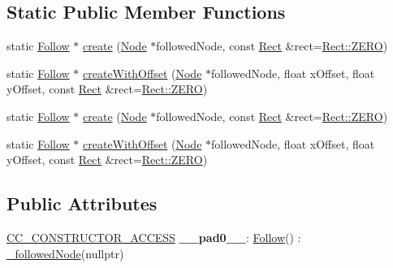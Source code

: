 \subsection*{Static Public Member Functions}
\begin{DoxyCompactItemize}
\item 
static \hyperlink{classFollow}{Follow} $\ast$ \hyperlink{classFollow_aeb7d82d7545e2b2ab7826f8f6661d5b7}{create} (\hyperlink{classNode}{Node} $\ast$followed\+Node, const \hyperlink{classRect}{Rect} \&rect=\hyperlink{classRect_a590be46e60027b2ca0f62a457f91a83e}{Rect\+::\+Z\+E\+RO})
\item 
static \hyperlink{classFollow}{Follow} $\ast$ \hyperlink{classFollow_aaf83879939906af8b827af3dd845383b}{create\+With\+Offset} (\hyperlink{classNode}{Node} $\ast$followed\+Node, float x\+Offset, float y\+Offset, const \hyperlink{classRect}{Rect} \&rect=\hyperlink{classRect_a590be46e60027b2ca0f62a457f91a83e}{Rect\+::\+Z\+E\+RO})
\item 
static \hyperlink{classFollow}{Follow} $\ast$ \hyperlink{classFollow_a219ed46966d5f7065cf628df6eed4681}{create} (\hyperlink{classNode}{Node} $\ast$followed\+Node, const \hyperlink{classRect}{Rect} \&rect=\hyperlink{classRect_a590be46e60027b2ca0f62a457f91a83e}{Rect\+::\+Z\+E\+RO})
\item 
static \hyperlink{classFollow}{Follow} $\ast$ \hyperlink{classFollow_ae200c960d98090f61c0c03fa600c4fe2}{create\+With\+Offset} (\hyperlink{classNode}{Node} $\ast$followed\+Node, float x\+Offset, float y\+Offset, const \hyperlink{classRect}{Rect} \&rect=\hyperlink{classRect_a590be46e60027b2ca0f62a457f91a83e}{Rect\+::\+Z\+E\+RO})
\end{DoxyCompactItemize}
\subsection*{Public Attributes}
\begin{DoxyCompactItemize}
\item 
\mbox{\label{classFollow_a2bc83f93b0ad4e73405ef2adfa6fb132}} 
\hyperlink{_2cocos2d_2cocos_2base_2ccConfig_8h_a25ef1314f97c35a2ed3d029b0ead6da0}{C\+C\+\_\+\+C\+O\+N\+S\+T\+R\+U\+C\+T\+O\+R\+\_\+\+A\+C\+C\+E\+SS} {\bfseries \+\_\+\+\_\+pad0\+\_\+\+\_\+}\+: \hyperlink{classFollow}{Follow}() \+: \hyperlink{classFollow_af63d9e8e625928e14a136c8863c169f6}{\+\_\+followed\+Node}(nullptr)
\end{DoxyCompactItemize}

